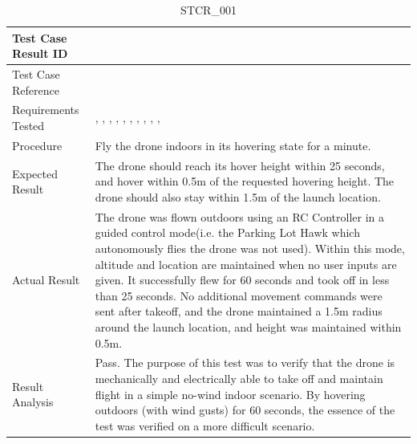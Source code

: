 \documentclass[12pt, titlepage]{article}
\begin{document}
\begin{table}[!h]
\begin{center}
\caption {STCR\_001}
\label{tab:STCR_001}
\begin{tabular}{ | m{3.2cm} | m{12.2cm} | } 
\hline
Test Case Result ID & \nameref{tab:STCR_001} \\ 
\hline
Test Case Reference & \nameref{tab:STC_001}  \\ 
\hline
Requirements Tested & \nameref{GEN_003}, \nameref{GEN_004}, \nameref{STA_000}, \nameref{STA_001}, \nameref{STA_004}, \nameref{STA_005}, \nameref{STA_006}, \nameref{TRANS_002}, \nameref{TRANS_003}, \nameref{TRANS_009}, \nameref{PERF_002} \\ 
\hline
Procedure & Fly the drone indoors in its hovering state for a minute. \\ 
\hline
Expected Result & The drone should reach its hover height within 25 seconds, and hover within 0.5m of the requested hovering height. The drone should also stay within 1.5m of the launch location.  \\ 
\hline
Actual Result & The drone was flown outdoors using an RC Controller in a guided control mode(i.e. the Parking Lot Hawk which autonomously flies the drone was not used). Within this mode, altitude and location are maintained when no user inputs are given. It successfully flew for 60 seconds and took off in less than 25 seconds. No additional movement commands were sent after takeoff, and the drone maintained a 1.5m radius around the launch location, and height was maintained within 0.5m.  \\ 
\hline
Result Analysis & Pass. The purpose of this test was to verify that the drone is mechanically and electrically able to take off and maintain flight in a simple no-wind indoor scenario. By hovering outdoors (with wind gusts) for 60 seconds, the essence of the test was verified on a more difficult scenario.  \\ 
\hline
\end{tabular}
\end{center}
\end{table}
\end{document}
